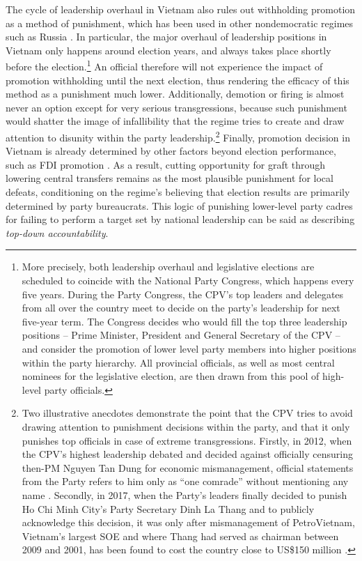\documentclass[12pt]{article}\usepackage[]{graphicx}\usepackage[]{color}
\newcommand{\1}{\mathbbm{1}}
\begin{document}
The cycle of leadership overhaul in Vietnam also rules out withholding promotion as a method of punishment, which has been used in other nondemocratic regimes such as Russia \citep[][136]{Myagkov2009}. In particular, the major overhaul of leadership positions in Vietnam only happens around election years, and always takes place shortly before the election.\footnote{More precisely, both leadership overhaul and legislative elections are scheduled to coincide with the National Party Congress, which happens every five years. During the Party Congress, the CPV's top leaders and delegates from all over the country meet to decide on the party's leadership for next five-year term. The Congress decides who would fill the top three leadership positions -- Prime Minister, President and General Secretary of the CPV -- and consider the promotion of lower level party members into higher positions within the party hierarchy. All provincial officials, as well as most central nominees for the legislative election, are then drawn from this pool of high-level party officials.} An official therefore will not experience the impact of promotion withholding until the next election, thus rendering the efficacy of this method as a punishment much lower. Additionally, demotion or firing is almost never an option except for very serious transgressions, because such punishment would shatter the image of infallibility that the regime tries to create and draw attention to disunity within the party leadership.\footnote{Two illustrative anecdotes demonstrate the point that the CPV tries to avoid drawing attention to punishment decisions within the party, and that it only punishes top officials in case of extreme transgressions. Firstly, in 2012, when the CPV's highest leadership debated and decided against officially censuring then-PM Nguyen Tan Dung for economic mismanagement, official statements from the Party refers to him only as ``one comrade'' without mentioning any name \citep{voa2012}. Secondly, in 2017, when the Party's leaders finally decided to punish Ho Chi Minh City's Party Secretary Dinh La Thang and to publicly acknowledge this decision, it was only after mismanagement of PetroVietnam, Vietnam's largest SOE and where Thang had served as chairman between 2009 and 2001, has been found to cost the country close to US\$150 million \citep{BBC2017}.} Finally, promotion decision in Vietnam is already determined by other factors beyond election performance, such as FDI promotion \citep{JensenMalesky2015}. As a result, cutting opportunity for graft through lowering central transfers remains as the most plausible punishment for local defeats, conditioning on the regime’s believing that election results are primarily determined by party bureaucrats. This logic of punishing lower-level party cadres for failing to perform a target set by national leadership can be said as describing \textit{top-down accountability}.
\end{document}
